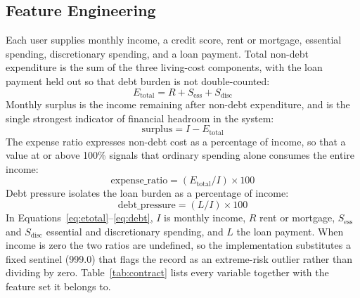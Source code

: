 \subsection{Feature Engineering}\label{subsec:feature-eng}
Each user supplies monthly income, a credit score, rent or mortgage, essential spending,
discretionary spending, and a loan payment. Total non-debt expenditure is the sum of the
three living-cost components, with the loan payment held out so that debt burden is not
double-counted:
\begin{equation}\label{eq:etotal}
E_{\text{total}} = R + S_{\text{ess}} + S_{\text{disc}}
\end{equation}
Monthly surplus is the income remaining after non-debt expenditure, and is the single
strongest indicator of financial headroom in the system:
\begin{equation}\label{eq:surplus}
\text{surplus} = I - E_{\text{total}}
\end{equation}
The expense ratio expresses non-debt cost as a percentage of income, so that a value at
or above 100\% signals that ordinary spending alone consumes the entire income:
\begin{equation}\label{eq:expratio}
\text{expense\_ratio} = (E_{\text{total}} / I) \times 100
\end{equation}
Debt pressure isolates the loan burden as a percentage of income:
\begin{equation}\label{eq:debt}
\text{debt\_pressure} = (L / I) \times 100
\end{equation}
In Equations~\eqref{eq:etotal}--\eqref{eq:debt}, $I$ is monthly income, $R$ rent or
mortgage, $S_{\text{ess}}$ and $S_{\text{disc}}$ essential and discretionary spending,
and $L$ the loan payment. When income is zero the two ratios are undefined, so the
implementation substitutes a fixed sentinel (999.0) that flags the record as an
extreme-risk outlier rather than dividing by zero. Table~\ref{tab:contract} lists every
variable together with the feature set it belongs to.

